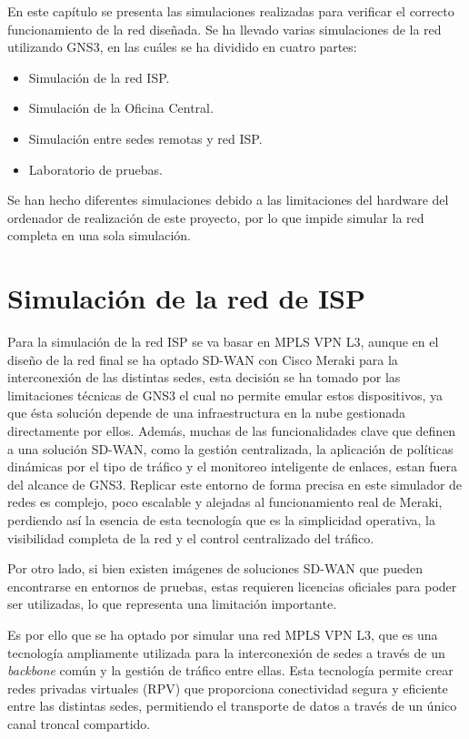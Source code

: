 En este capítulo se presenta las simulaciones realizadas para verificar el correcto funcionamiento de la
red diseñada. Se ha llevado varias simulaciones de la red utilizando GNS3, en
las cuáles se ha dividido en cuatro partes:
\begin{itemize}
	\item Simulación de la red ISP.
	\item Simulación de la Oficina Central.
	\item Simulación entre sedes remotas y red ISP.
	\item Laboratorio de pruebas.
\end{itemize}

Se han hecho diferentes simulaciones debido a las limitaciones del hardware del ordenador de realización de este proyecto, por lo que impide simular la red completa en una sola simulación.

\section{Simulación de la red de ISP}
\label{sec:simulacion_red_isp}
Para la simulación de la red ISP se va basar en MPLS VPN L3, aunque en el diseño de la red final se ha optado SD-WAN con Cisco Meraki para la interconexión de las distintas sedes, esta decisión se ha tomado por las limitaciones técnicas de GNS3 el cual no permite emular estos dispositivos, ya que ésta solución depende de una infraestructura en la nube gestionada directamente por ellos. Además, muchas de las funcionalidades clave que definen a una solución SD-WAN, como la gestión centralizada, la aplicación de políticas dinámicas por el tipo de tráfico y el monitoreo inteligente de enlaces, estan fuera del alcance de GNS3. Replicar este entorno de forma precisa en este simulador de redes es complejo, poco escalable y alejadas al funcionamiento real de Meraki, perdiendo así la esencia de esta tecnología que es la simplicidad operativa, la visibilidad completa de la red y el control centralizado del tráfico.

\vspace{0.5cm}
Por otro lado, si bien existen imágenes de soluciones SD-WAN que pueden encontrarse en entornos de pruebas, estas requieren licencias oficiales para poder ser utilizadas, lo que representa una limitación importante.

\vspace{0.5cm}
Es por ello que se ha optado por simular una red MPLS VPN L3, que es una tecnología ampliamente utilizada para la interconexión de sedes a través de un \textit{backbone} común y la gestión de tráfico entre ellas. Esta tecnología permite crear redes privadas virtuales (RPV) que proporciona conectividad segura y eficiente entre las distintas sedes, permitiendo el transporte de datos a través de un único canal troncal compartido.

